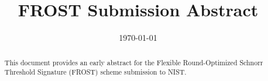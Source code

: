 \documentclass{llncs}
\title{FROST Submission Abstract}
\date{\today}
\author{}
\institute{}
\begin{document}
\let\oldaddcontentsline\addcontentsline
\def\addcontentsline#1#2#3{}

	\maketitle


	\begin{abstract}
    This document provides an early abstract for the Flexible Round-Optimized
    Schnorr Threshold Signature (FROST) scheme submission to NIST.
  \end{abstract}

  \def\addcontentsline#1#2#3{\oldaddcontentsline{#1}{#2}{#3}}
	\onehalfspacing
  \setcounter{tocdepth}{3}
	\tableofcontents
	\singlespacing
	\newpage


	
	

	\printbibliography


\end{document}
